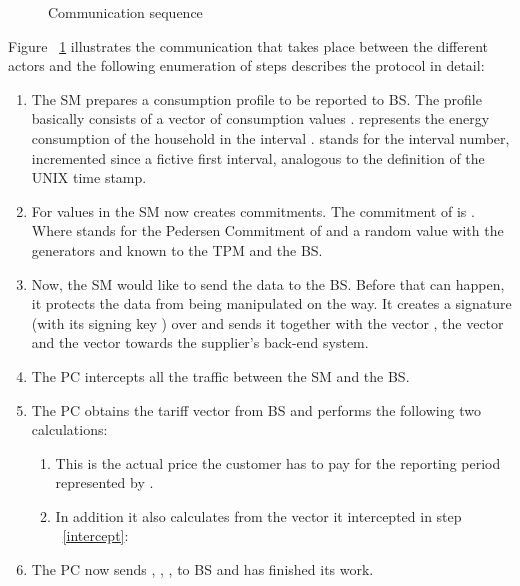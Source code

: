 \documentclass[english]{llncs}
\begin{document}
\begin{figure}
\centering

 \begin{sequencediagram}

    




  \end{sequencediagram}
\caption{Communication sequence}
\label{fig:sequence}
\end{figure}

Figure ~\ref{fig:sequence} illustrates the communication that takes place between the different actors and the following enumeration of steps describes the protocol in detail:
\begin{enumerate}
\item The SM prepares a consumption profile to be reported to BS. The profile basically consists of a vector of consumption values  
.  represents the energy consumption of the household in the interval .  stands for the interval number, 
incremented since a fictive first interval, analogous to the definition of the UNIX time stamp. 
\item For values in  the SM now creates commitments. The commitment of  is . Where  stands for the Pedersen Commitment  of  and a random value  with the generators  and  known to the TPM and the BS.
\item \label{sigi} Now, the SM would like to send the data to the BS. Before that can happen, it protects the data from being manipulated on the way. It creates a signature  (with its signing key ) over  and sends it together with the vector , the vector  and the vector  towards the supplier's back-end system.
\item \label{intercept} The PC intercepts all the traffic between the SM and the BS.
\item \label{tariff} The PC obtains the tariff vector  from BS and performs the following two calculations:
\begin{enumerate}
\item   This is the actual price the customer has to pay 
for the reporting period represented by . 
\item In addition it also calculates  from the vector  it intercepted in step ~\ref{intercept}:
 
\end{enumerate}
\item \label{proof} The PC now sends , , ,  to BS and has finished its work.
\end{enumerate}
\end{document}
